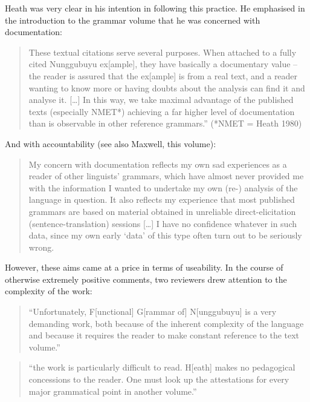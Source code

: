 Heath was very clear in his intention in following this practice. He emphasised in the introduction to the grammar volume that he was concerned with documentation: 

\begin{quote}
 These textual citations serve several purposes. When attached to a fully cited Nunggubuyu ex[ample], they have basically a documentary value -- the reader is assured that the ex[ample] is from a real text, and a reader wanting to know more or having doubts about the analysis can find it and analyse it.  [{\dots}] In this way, we take maximal advantage of the published texts (especially NMET*) achieving a far higher level of documentation than is observable in other reference grammars.'' \citep[4]{Heath1984} (*NMET = Heath 1980)
\end{quote}

And with accountability (see also Maxwell, this volume):

\begin{quote} 
 My concern with documentation reflects my own sad experiences as a reader of other linguists' grammars, which have almost never provided me with the information I wanted to undertake my own (re-) analysis of the language in question. It also reflects my experience that most published grammars are based on material obtained in unreliable direct-elicitation (sentence-translation) sessions [{\dots}] I have no confidence whatever in such data, since my own early `data' of this type often turn out to be seriously wrong. \citep[5]{Heath1984}
\end{quote}

However, these aims came at a price in terms of useability. In the course of otherwise extremely positive comments, two reviewers drew attention to the complexity of the work:
\begin{quote}
 ``Unfortunately, F[unctional] G[rammar of] N[unggubuyu] is a very demanding work, both because of the inherent complexity of the language and because it requires the reader to make constant reference to the text volume.'' \citep[310]{Blake1985} 
\end{quote}

\begin{quote}
 ``the work is particularly difficult to read. H[eath] makes no pedagogical concessions to the reader. One must look up the attestations for every major grammatical point in another volume.'' \citep[654-655]{Haiman1986}
\end{quote}

